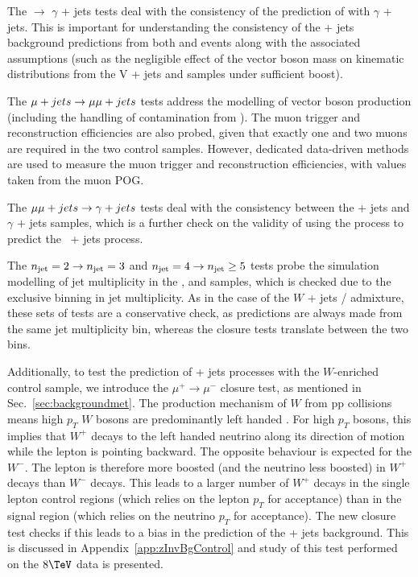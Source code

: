 The \mj $\rightarrow$ $\gamma$ + jets tests deal with
the consistency of the prediction of \wej with $\gamma$ + jets. This is 
important for understanding
the consistency of the \znunu + jets background predictions from both
\wej and \gj events along with the associated assumptions (such
as the negligible effect of the vector boson mass on kinematic
distributions from the V + jets and \gj samples under sufficient
boost). 

The $\mu + jets \rightarrow \mu\mu + jets$ tests address the modelling of vector boson production
(including the handling of contamination from \ttbar). The muon
trigger and reconstruction efficiencies are also probed, given that
exactly one and two muons are required in the two control
samples. However, dedicated data-driven methods are used to measure
the muon trigger and reconstruction efficiencies, with values taken
from the muon POG.

The $\mu\mu + jets \rightarrow \gamma + jets$ tests deal with the
consistency between the \zee + jets and $\gamma$ + jets
samples, which is a further check on the validity of using the \gj
process to predict the \znunu\, + jets process.

The $n_{\text{jet}}=2\rightarrow n_{\text{jet}}=3$ and $n_{\text{jet}}=4\rightarrow n_{\text{jet}}\geq5$ tests 
probe the simulation modelling of jet
multiplicity in the \mj,
\mmj and \gj samples,
which is checked due to the exclusive binning in jet multiplicity.  As
in the case of the $W$ + jets / \ttbar admixture, these sets of tests
are a conservative check, as predictions are always made from the same
jet multiplicity bin, whereas the closure tests translate between the
two bins.

Additionally, to test the prediction of \znunu + jets processes with
the $W$-enriched \mj control sample, we introduce the
$\mu^{+}\rightarrow\mu^{-}$ closure test, as mentioned in
Sec.~\ref{sec:backgroundmet}. The production mechanism of $W$ from pp collisions means
high $p_T$ $W$ bosons are predominantly left handed \cite{WPol}.  
For high $p_T$ bosons, this implies that $W^+$ decays 
to the left handed neutrino along its direction of motion while 
the lepton is pointing backward. The opposite behaviour is
expected for the $W^-$. The lepton is therefore more boosted (and
the neutrino less boosted) in $W^+$ decays than $W^-$ decays.  This
leads to a larger number of $W^+$ decays in the single lepton control
regions (which relies on the lepton $p_T$ for acceptance) than in the
signal region (which relies on the neutrino $p_T$ for acceptance). The
new closure test checks if this leads to a bias in the prediction of the 
\znunu + jets background. This is discussed in
Appendix~\ref{app:zInvBgControl} and study of this test performed on the
$8\tev$ data is presented.

